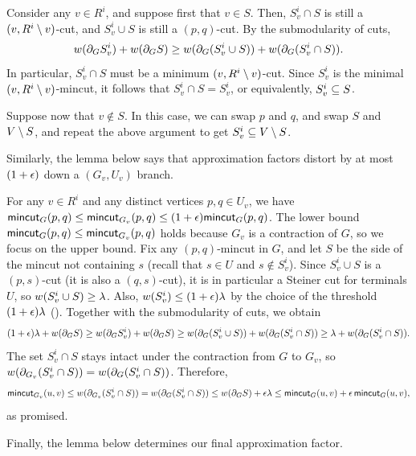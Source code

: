 Consider any $v\in R^i$, and suppose first that $v\in S$. Then, $S^i_v\cap S$ is still a $(v,R^i\setminus v)$-cut, and $S^i_v\cup S$ is still a $(p,q)$-cut. By the submodularity of cuts,
\[ w(\partial_GS^i_v) + w(\partial_GS) \ge w(\partial_G(S^i_v\cup S)) + w(\partial_G(S^i_v\cap S)). \]
In particular, $S^i_v\cap S$ must be a minimum $(v,R^i\setminus v)$-cut. Since $S^i_v$ is the minimal $(v,R^i\setminus v)$-mincut, it follows that $S^i_v\cap S = S^i_v$, or equivalently, $S^i_v\subseteq S$.

Suppose now that $v\notin S$. In this case, we can swap $p$ and $q$, and swap $S$ and $V\setminus S$, and repeat the above argument to get $S^i_v\subseteq V\setminus S$.
\EP

Similarly, the lemma below says that approximation factors distort by at most $(1+\epsilon)$ down a $(G_v,U_v)$ branch.

\BL{}
For any $v\in  R^i$ and any distinct vertices $p,q\in U_v$, we have $\textsf{\textup{mincut}}_G(p,q)\le\textsf{\textup{mincut}}_{G_v}(p,q)\le(1+\epsilon)\textsf{\textup{mincut}}_G(p,q)$.
\EL
\BP
The lower bound $\textsf{\textup{mincut}}_G(p,q)\le\textsf{\textup{mincut}}_{G_v}(p,q)$ holds because $G_v$ is a contraction of $G$, so we focus on the upper bound.
Fix any $(p,q)$-mincut in $G$, and let $S$ be the side of the mincut not containing $s$ (recall that $s\in U$ and $s\notin S^i_v$). Since $S^i_v\cup S$ is a $(p, s)$-cut (it is also a $(q, s)$-cut), it is in particular a Steiner cut for terminals $U$, so $w(S^i_v\cup S)\ge\lambda$. Also, $w(S^i_v)\le(1+\epsilon)\lambda$ by the choice of the threshold $(1+\epsilon)\lambda$ (). Together with the submodularity of cuts, we obtain
\[ (1+\epsilon)\lambda+w(\partial_GS) \ge w(\partial_GS^i_v) + w(\partial_GS) \ge w(\partial_G(S^i_v\cup S)) + w(\partial_G(S^i_v\cap S)) \ge \lambda + w(\partial_G(S^i_v\cap S)) .\]
The set $S^i_v\cap S$ stays intact under the contraction from $G$ to $G_v$, so $w(\partial_{G_v}(S^i_v\cap S))=w(\partial_G(S^i_v\cap S))$. Therefore,
\[ \textsf{\textup{mincut}}_{G_v}(u,v)\le w(\partial_{G_v}(S^i_v\cap S))=w(\partial_G(S^i_v\cap S)) \le w(\partial_GS)+\epsilon\lambda \le \textsf{\textup{mincut}}_G(u,v) + \epsilon\,\textsf{\textup{mincut}}_G(u,v) ,\]
as promised.
\EP

Finally, the lemma below determines our final approximation factor.

